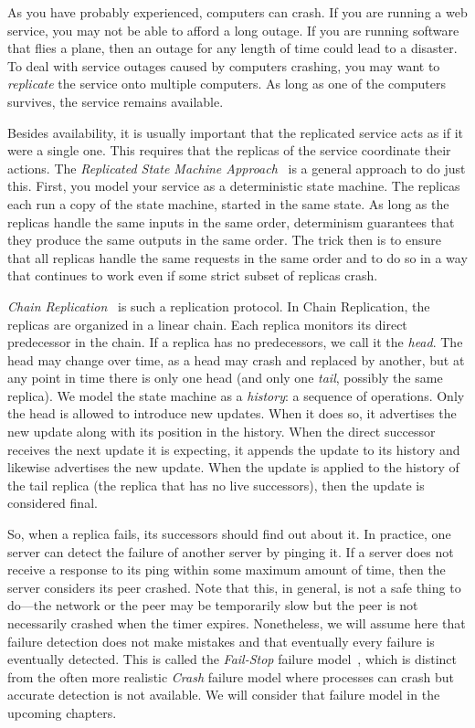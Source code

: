 \documentclass{report}
\begin{document}
%
%
As you have probably experienced, computers can crash.
If you are running a web service, you may not be able to afford
a long outage.  If you are running software that flies a plane,
then an outage for any length of time could lead to a disaster.
To deal with service outages caused by computers crashing, you may want
to \emph{replicate} the service onto multiple computers.  As long as
one of the computers survives, the service remains available.

%
%
%
Besides availability, it is usually important that the replicated
service acts as if it were a single one.  This requires that the
replicas of the service coordinate their actions.
The \emph{Replicated State Machine Approach}~\cite{Lam78,S90} is a
general approach to do just this.
First, you model your service as a deterministic state
machine.  The replicas each run a copy of the state machine, started
in the same state.  As long as the replicas handle the same inputs
in the same order, determinism guarantees that they produce the same
outputs in the same order.
The trick then is to ensure that all replicas handle the
same requests in the same order and to do so in a way that continues
to work even if some strict subset of replicas crash.

\emph{Chain Replication}~\cite{vRS04} is such a replication protocol.
In Chain Replication, the replicas are organized in a linear chain.
Each replica monitors its direct predecessor in the chain.  If a replica has
no predecessors, we call it the \emph{head}.  The head may change over
time, as a head may crash and replaced by another, but at any point in
time there is only one head
(and only one \emph{tail}, possibly the same replica).
We model the state machine as a \emph{history}: a sequence of operations.
Only the head is allowed to introduce new updates.
When it does so, it advertises the new update along with its position
in the history.  When the direct successor receives the next update
it is expecting, it appends the update to its history and likewise
advertises the new update.  When the update is applied to the history
of the tail replica (the replica that has no live successors),
then the update is considered final.

So, when a replica fails, its successors should find out about it.
In practice, one server can detect the failure of another server by
pinging it.  If a server does not receive a response to its ping within
some maximum amount of time, then the server considers its peer crashed.
Note that this, in general, is not a safe thing to do---the network or
the peer may be temporarily slow but the peer is not necessarily crashed
when the timer expires.
Nonetheless, we will assume here that failure detection does not make
mistakes and that eventually every failure is eventually detected.
This is called the \emph{Fail-Stop} failure model~\cite{SS83},
which is distinct from the often more realistic \emph{Crash} failure model
where processes can crash but accurate detection is not available.
We will consider that failure model in the upcoming chapters.
\end{document}
